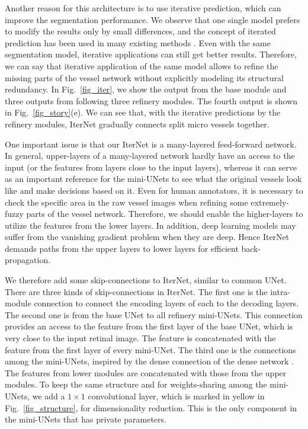 \documentclass[10pt,twocolumn,letterpaper]{article}
\begin{document}
Another reason for this architecture is to use iterative prediction, which can improve the segmentation performance. We observe that one single model prefers to modify the results only by small differences, and the concept of iterated prediction has been used in many existing methods \cite{7042289,8036917}. Even with the same segmentation model, iterative applications can still get better results. Therefore, we can say that iterative application of the same model allows to refine the missing parts of the vessel network without explicitly modeling its structural redundancy. 
In Fig.~\ref{fig_iter}, we show the output from the base module and three outputs from following three refinery modules. The fourth output is shown in Fig.~\ref{fig_story}(e). We can see that, with the iterative predictions by the refinery modules, IterNet gradually connects split micro vessels together.

One important issue is that our IterNet is a many-layered feed-forward network. In general, upper-layers of a many-layered network hardly have an access to the input (or the features from layers close to the input layers), whereas it can serve as an important reference for the mini-UNets to see what the original vessels look like and make decisions based on it. Even for human annotators, it is necessary to check the specific area in the raw vessel images when refining some extremely-fuzzy parts of the vessel network. Therefore, we should enable the higher-layers to utilize the features from the lower layers. In addition, deep learning models may suffer from the vanishing gradient problem when they are deep. Hence IterNet demands paths from the upper layers to lower layers for efficient back-propagation. 

We therefore add some skip-connections to IterNet, similar to common UNet. There are three kinds of skip-connections in IterNet. The first one is the intra-module connection to connect the encoding layers of each to the decoding layers. The second one is from the base UNet to all refinery mini-UNets. This connection provides an access to the feature from the first layer of the base UNet, which is very close to the input retinal image. The feature is concatenated with the feature from the first layer of every mini-UNet. The third one is the connections among the mini-UNets, inspired by the dense connection of the dense network \cite{8099726}. The features from lower modules are concatenated with those from the upper modules. To keep the same structure and for weights-sharing among the mini-UNets, we add a $1\times 1$ convolutional layer, which is marked in yellow in Fig.~\ref{fig_structure}, for dimensionality reduction. This is the only component in the mini-UNets that has private parameters.
\end{document}
